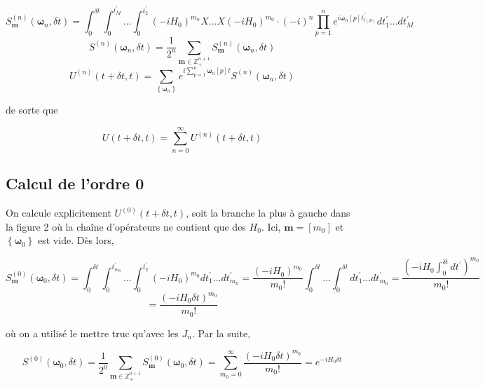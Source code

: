 \begin{equation}
    S^{(n)}_{\boldsymbol{m}}(\boldsymbol{\omega}_n, \delta t) = \int_{0}^{\delta t}\int_{0}^{t_M^{'}}...\int_{0}^{t_2^{'}} (-iH_0)^{m_n}X...X(-iH_0)^{m_0} \cdot (-i)^n \prod_{p=1}^{n}e^{i\boldsymbol{\omega}_n[p]t_{l(p)}^{'}} dt_1^{'} ... dt_M^{'}
\end{equation}
\begin{equation}
    S^{(n)}(\boldsymbol{\omega}_n, \delta t) = \frac{1}{2^n}\sum_{\boldsymbol{m} \in \mathbb{Z}^{n+1}_+} S^{(n)}_{\boldsymbol{m}}(\boldsymbol{\omega}_n, \delta t)
\end{equation}
\begin{equation}
    U^{(n)}(t + \delta t, t) = \sum_{\left\{\boldsymbol{\omega}_n\right\}}e^{i\sum_{p=1}^{n}\boldsymbol{\omega}_n[p]t}S^{(n)}(\boldsymbol{\omega}_n, \delta t)
\end{equation}

de sorte que 

\begin{equation}
    U(t+\delta t, t) = \sum_{n=0}^{\infty}U^{(n)}(t+\delta t, t)
\end{equation}

\subsection{Calcul de l'ordre 0}
On calcule explicitement $U^{(0)}(t+\delta t, t)$, soit la branche la plus à gauche dans la figure 2 où la chaîne d'opérateurs ne contient que des $H_0$. Ici, $\boldsymbol{m} = [m_0]$ et $\left\{\boldsymbol{\omega}_0\right\}$ est vide. Dès lors,

\begin{equation*}
    S^{(0)}_{\boldsymbol{m}}(\boldsymbol{\omega}_0, \delta t) = \int_{0}^{\delta t}\int_{0}^{t_{m_0}^{'}}...\int_{0}^{t_2^{'}} (-iH_0)^{m_0}dt_1^{'}...dt_{m_0}^{'} = \frac{(-iH_0)^{m_0}}{m_0!}\int_{0}^{\delta t}...\int_{0}^{\delta t}dt_1^{'}...dt_{m_0}^{'} = \frac{(-iH_0\int_{0}^{\delta t}dt^{'})^{m_0}}{m_0!}
\end{equation*}
\begin{equation*}
    = \frac{(-iH_0\delta t)^{m_0}}{m_0!}
\end{equation*}

où on a utilisé le mettre truc qu'avec les $J_n$. Par la suite,

\begin{equation*}
    S^{(0)}(\boldsymbol{\omega}_0, \delta t) = \frac{1}{2^0}\sum_{\boldsymbol{m} \in \mathbb{Z}^{0+1}_{+}}S^{(0)}_{\boldsymbol{m}}(\boldsymbol{\omega}_0, \delta t) = \sum_{m_0=0}^{\infty}\frac{(-iH_0\delta t)^{m_0}}{m_0!} = e^{-iH_0\delta t}
\end{equation*}


